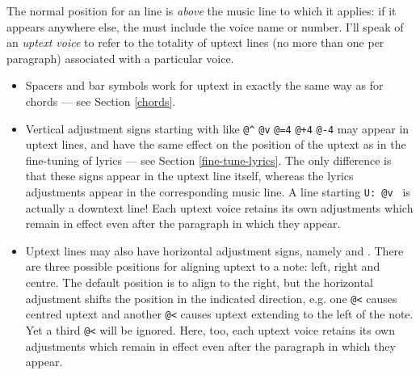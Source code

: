 \documentclass[11pt]{article}
\begin{document}
The normal position 
for an  line is \emph{above} the music line to which it applies: 
if it appears anywhere else, the  must include the voice name or 
number. I'll speak of an \emph{uptext voice}  to refer to 
the totality of uptext lines (no more than one per paragraph) 
associated with a particular voice. 
 \begin{itemize}
 \item Spacers \ttxem{\snake} and bar symbols \ttxem{\|} work for uptext in 
exactly the same way as for chords --- see Section \ref{chords}.  
 \item Vertical adjustment signs starting with \ixem{\atsign}
like {\verb"@^"} \verb"@v" \verb"@=4" 
\verb"@+4" \verb"@-4" may appear 
in uptext lines, and have the same effect on the position of the uptext as in 
the fine-tuning of lyrics --- see Section \ref{fine-tune-lyrics}.  The only 
difference is that these signs appear in the uptext line itself, whereas the 
lyrics adjustments appear in the corresponding music line. A line starting 
\verb"U: @v " is actually a downtext line!  Each uptext voice retains its own 
adjustments which remain in effect even after the paragraph in which they 
appear.                                     

 \item Uptext lines may also have horizontal adjustment signs, namely 
\ixem{\atsign\less} and \ixem{\atsign\more}.  There are three possible 
positions for aligning uptext to a note: left, right and centre.  The 
default position is to align to the right, but the horizontal adjustment 
shifts the position in the indicated direction, e.g. one \verb"@<" causes 
centred uptext and another \verb"@<" causes uptext extending to the left of the 
note.  Yet a third \verb"@<" will be ignored.  Here, too, each uptext 
voice retains its own adjustments which remain in effect even after the 
paragraph in which they appear.                                


\end{itemize}
\end{document}
